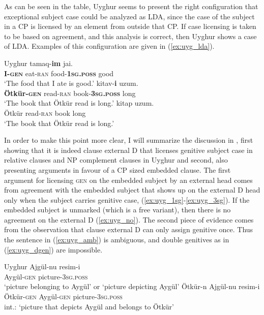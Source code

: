 \documentclass[output=paper
,modfonts
,nonflat]{langsci/langscibook}
\begin{document}
As can be seen in the table, Uyghur seems to present the right configuration that exceptional subject case could be analyzed as LDA, since the case of the subject in a CP is licensed by an element from outside that CP. If case licensing is taken to be based on agreement, and this analysis is correct, then Uyghur shows a case of LDA. Examples of this configuration are given in (\ref{ex:uyg_lda}).
\begin{exe}
\ex Uyghur \citep[][4]{Asarina_Hartman2011b}\label{ex:uyg_lda}
	\xlist
	\ex 
		 tamaq-\textbf{im} jai.\\
		 	 {} \textbf{I-\textsc{gen}} eat-\textsc{ran} {} food-\textbf{1\textsc{sg.poss}} good\\
		\glt `The food that I ate is good.'\label{ex:uyg_1sg}
	\ex
		 kitav-\textbf{i} uzum.\\
			 {} \textbf{Ötkür-\textsc{gen}} read-\textsc{ran} {} book-\textbf{3\textsc{sg.poss}} long\\
		\glt `The book that Ötkür read is long.'\label{ex:uyg_3sg}
	\ex
		 kitap uzum.\\
			 {} Ötkür read-\textsc{ran} {} book long\\
		\glt `The book that Ötkür read is long.'\label{ex:uyg_no}
	\endxlist
\end{exe}
In order to make this point more clear, I will summarize the discussion in \citet{Asarina_Hartman2011a}, first showing that it is indeed clause external D that licenses genitive subject case in relative clauses and NP complement clauses in Uyghur and second, also presenting arguments in favour of a CP sized embedded clause. The first argument for licensing \textsc{gen} on the embedded subject by an external head comes from agreement with the embedded subject that shows up on the external D head only when the subject carries genitive case, (\ref{ex:uyg_1sg}-\ref{ex:uyg_3sg}). If the embedded subject is unmarked (which is a free variant), then there is no agreement on the external D (\ref{ex:uyg_no}). The second piece of evidence comes from the observation that clause external D can only assign genitive once. Thus the sentence in (\ref{ex:uyg_amb}) is ambiguous, and double genitives as in (\ref{ex:uyg_dgen}) are impossible.
\begin{exe}
\ex Uyghur \citep[][3]{Asarina_Hartman2011a}
	\xlist
	\ex \label{ex:uyg_amb}
		\gll Ajgül-nu resim-i\\
			 Aygül-\textsc{gen} picture-3\textsc{sg.poss}\\
		\glt `picture belonging to Aygül' or `picture depicting Aygül'
	\ex \label{ex:uyg_dgen}
		\gll *Ötkür-n Ajgül-nu resim-i\\
			 Ötkür-\textsc{gen} Aygül-\textsc{gen} picture-3\textsc{sg.poss}\\
		\glt int.: `picture that depicts Aygül and belongs to Ötkür'
	\endxlist
\end{exe}
\end{document}
